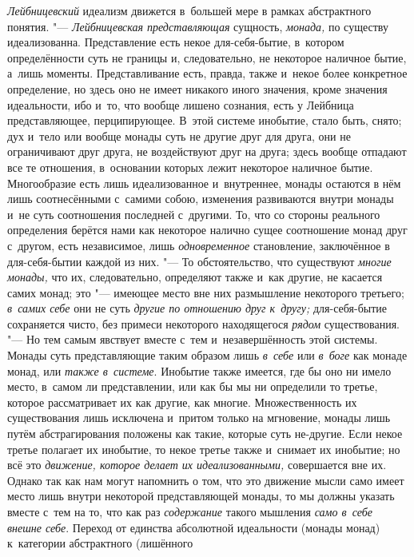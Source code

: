 {\em Лейбницевский} идеализм движется в~большей мере в
рамках абстрактного понятия. "--- {\em Лейбницевская
представляющая} сущность, {\em монада,} по существу
идеализованна. Представление есть некое для-себя-бытие, в~котором
определённости суть не границы и, следовательно, не некоторое наличное
бытие, а~лишь моменты. Представливание есть, правда, также и~некое более
конкретное определение, но здесь оно не имеет никакого иного значения,
кроме значения идеальности, ибо и~то, что вообще лишено сознания, есть у
Лейбница представляющее, перципирующее. В~этой системе инобытие, стало
быть, снято; дух и~тело или вообще монады суть не другие друг для друга,
они не ограничивают друг друга, не воздействуют друг на друга; здесь вообще
отпадают все те отношения, в~основании которых лежит некоторое наличное
бытие. Многообразие есть лишь идеализованное и~внутреннее, монады остаются
в нём лишь соотнесёнными с~самими собою, изменения развиваются внутри
монады и~не суть соотношения последней с~другими. То, что со стороны
реального определения берётся нами как некоторое налично сущее соотношение
монад друг с~другом, есть независимое, лишь
{\em одновременное} становление, заключённое в
для-себя-бытии каждой из них. "--- То обстоятельство, что существуют
{\em многие монады,} что их, следовательно, определяют
также и~как другие, не касается самих монад; это "--- имеющее место вне них
размышление некоторого третьего; {\em в~самих себе} они
не суть {\em другие по отношению друг к~другу;}
для-себя-бытие сохраняется чисто, без примеси некоторого находящегося
{\em рядом} существования. "--- Но тем самым явствует
вместе с~тем и~незавершённость этой системы. Монады суть представляющие
таким образом лишь {\em в~себе} или {\em в~боге} как монаде монад, или
{\em также в~системе}. Инобытие также имеется, где бы
оно ни имело место, в~самом ли представлении, или как бы мы ни определили
то третье, которое рассматривает их как другие, как многие. Множественность
их существования лишь исключена и~притом только на мгновение, монады лишь
путём абстрагирования положены как такие, которые суть не-другие. Если
некое третье полагает их инобытие, то некое третье также и~снимает их
инобытие; но всё это {\em движение, которое делает их
идеализованными,} совершается вне их. Однако так как нам могут напомнить о
том, что это движение мысли само имеет место лишь внутри некоторой
представляющей монады, то мы должны указать вместе с~тем на то, что как раз
{\em содержание} такого мышления
{\em само в~себе внешне себе}. Переход от единства
абсолютной идеальности (монады монад) к~категории абстрактного (лишённого
